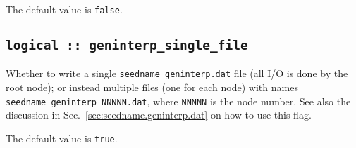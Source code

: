 The default value is \verb#false#.

\subsection[geninterp\_alsofirstder]{\tt logical :: geninterp\_single\_file}
Whether to write a single  {\tt seedname\_geninterp.dat} file (all I/O is done by the root node); or
instead multiple files (one for each node) with
names {\tt seedname\_geninterp\_NNNNN.dat}, where {\tt NNNNN} is the
node number.
See also the discussion in Sec.~\ref{sec:seedname.geninterp.dat} on
how to use this flag.

The default value is \verb#true#.

